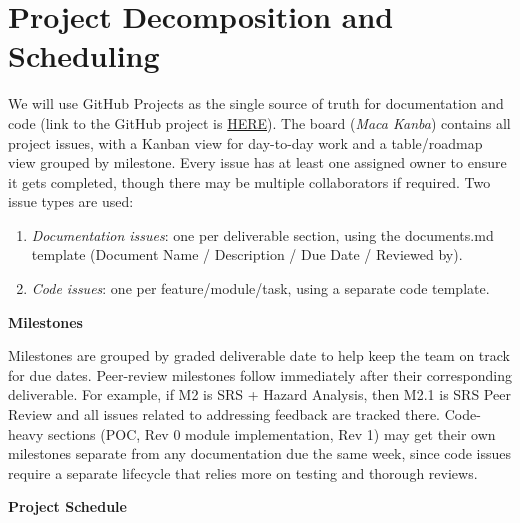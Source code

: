 \documentclass{article}
\begin{document}
\section{Project Decomposition and Scheduling}

We will use GitHub Projects as the single source of truth for documentation and
code (link to the GitHub project is \href{https://github.com/users/Nour-Fawaz/projects/8}{HERE}). The board (\textit{Maca Kanba})
contains all project issues, with a Kanban view for day-to-day work and a
table/roadmap view grouped by milestone. Every issue has at least one assigned owner to ensure it gets completed, though
there may be multiple collaborators if required. Two issue types are used:

\begin{enumerate}
    \item \textit{Documentation issues}: one per deliverable section, using the
    documents.md template (Document Name / Description / Due Date / Reviewed by).
    \item \textit{Code issues}: one per feature/module/task, using a separate code
    template.
\end{enumerate}

\medskip
\noindent\textbf{Milestones}

Milestones are grouped by graded deliverable date to help keep the team on track
for due dates. Peer-review milestones follow immediately after their
corresponding deliverable. For example, if M2 is SRS + Hazard Analysis, then
M2.1 is SRS Peer Review and all issues related to addressing feedback are
tracked there. Code-heavy sections (POC, Rev 0 module implementation, Rev 1) may get
their own milestones separate from any documentation due the same week, since
code issues require a separate lifecycle that relies more on testing and
thorough reviews.

\medskip
\noindent\textbf{Project Schedule}
\end{document}
